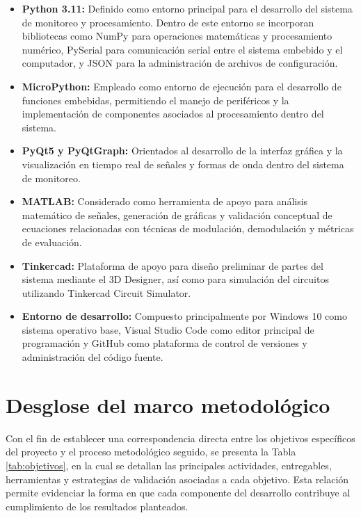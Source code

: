 \begin{itemize}

\item \textbf{Python 3.11:} Definido como entorno principal para el desarrollo del sistema de monitoreo y procesamiento. Dentro de este entorno se incorporan bibliotecas como NumPy para operaciones matemáticas y procesamiento numérico, PySerial para comunicación serial entre el sistema embebido y el computador, y JSON para la administración de archivos de configuración.

\item \textbf{MicroPython:} Empleado como entorno de ejecución para el desarrollo de funciones embebidas, permitiendo el manejo de periféricos y la implementación de componentes asociados al procesamiento dentro del sistema.

\item \textbf{PyQt5 y PyQtGraph:} Orientados al desarrollo de la interfaz gráfica y la visualización en tiempo real de señales y formas de onda dentro del sistema de monitoreo.

\item \textbf{MATLAB:} Considerado como herramienta de apoyo para análisis matemático de señales, generación de gráficas y validación conceptual de ecuaciones relacionadas con técnicas de modulación, demodulación y métricas de evaluación.

\item \textbf{Tinkercad:} Plataforma de apoyo para diseño preliminar de partes del sistema mediante el 3D Designer, así como para simulación del circuitos utilizando Tinkercad Circuit Simulator.

\item \textbf{Entorno de desarrollo:} Compuesto principalmente por Windows 10 como sistema operativo base, Visual Studio Code como editor principal de programación y GitHub como plataforma de control de versiones y administración del código fuente.

\end{itemize}

\section{Desglose del marco metodológico}

Con el fin de establecer una correspondencia directa entre los objetivos específicos del proyecto y el proceso metodológico seguido, se presenta la Tabla \ref{tab:objetivos}, en la cual se detallan las principales actividades, entregables, herramientas y estrategias de validación asociadas a cada objetivo. Esta relación permite evidenciar la forma en que cada componente del desarrollo contribuye al cumplimiento de los resultados planteados.

